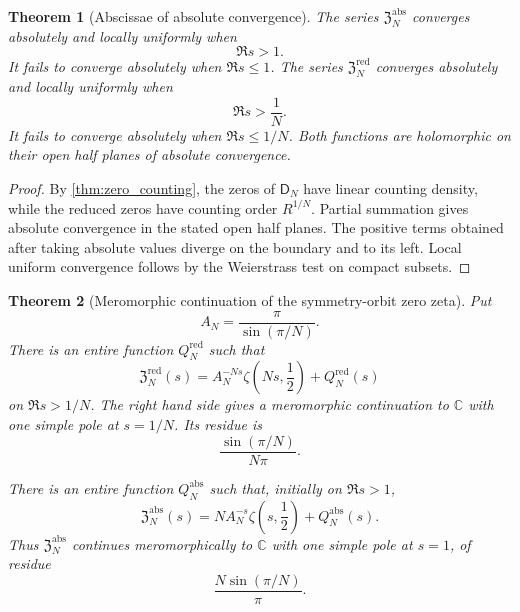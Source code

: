 \documentclass[11pt]{article}
\newtheorem{theorem}{Theorem}[section]
\theoremstyle{definition}
\theoremstyle{remark}
\newcommand{\CC}{\mathbb C}
\newcommand{\Dfun}{\mathsf D}
\begin{document}
\begin{theorem}[Abscissae of absolute convergence]\label{thm:zeta_convergence}
The series $\mathfrak Z_N^{\mathrm{abs}}$ converges absolutely and locally uniformly when
\[
\Re s>1.
\]
It fails to converge absolutely when $\Re s\leq1$.  The series $\mathfrak Z_N^{\mathrm{red}}$ converges absolutely and locally uniformly when
\[
\Re s>\frac1N.
\]
It fails to converge absolutely when $\Re s\leq1/N$.  Both functions are holomorphic on their open half planes of absolute convergence.
\end{theorem}

\begin{proof}
By \cref{thm:zero_counting}, the zeros of $\Dfun_N$ have linear counting density, while the reduced zeros have counting order $R^{1/N}$.  Partial summation gives absolute convergence in the stated open half planes.  The positive terms obtained after taking absolute values diverge on the boundary and to its left.  Local uniform convergence follows by the Weierstrass test on compact subsets.
\end{proof}

\begin{theorem}[Meromorphic continuation of the symmetry-orbit zero zeta]\label{thm:zeta_continuation}
Put
\[
A_N=\frac\pi{\sin(\pi/N)}.
\]
There is an entire function $Q_N^{\mathrm{red}}$ such that
\[
\mathfrak Z_N^{\mathrm{red}}(s)
=
A_N^{-Ns}\zeta\left(Ns,\frac12\right)+Q_N^{\mathrm{red}}(s)
\]
on $\Re s>1/N$.  The right hand side gives a meromorphic continuation to $\CC$ with one simple pole at $s=1/N$.  Its residue is
\[
\frac{\sin(\pi/N)}{N\pi}.
\]

There is an entire function $Q_N^{\mathrm{abs}}$ such that, initially on
$\Re s>1$,
\[
\mathfrak Z_N^{\mathrm{abs}}(s)
=
N A_N^{-s}\zeta\left(s,\frac12\right)+Q_N^{\mathrm{abs}}(s).
\]
Thus $\mathfrak Z_N^{\mathrm{abs}}$ continues meromorphically to $\CC$ with one simple pole at $s=1$, of residue
\[
\frac{N\sin(\pi/N)}\pi.
\]
\end{theorem}
\end{document}
